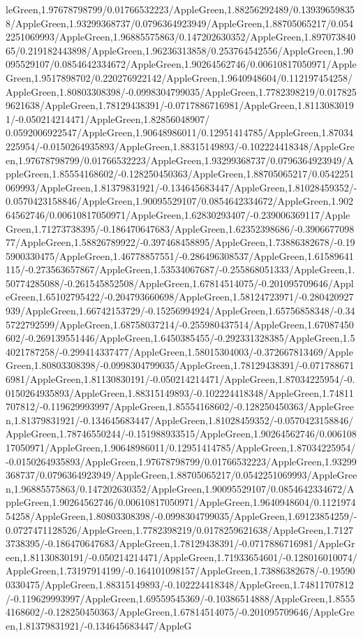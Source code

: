 {\begin{tikzternal}
{leGreen,1.97678798799/0.01766532223/AppleGreen,1.88256292489/0.139396598358/AppleGreen,1.93299368737/0.0796364923949/AppleGreen,1.88705065217/0.0542251069993/AppleGreen,1.96885575863/0.147202630352/AppleGreen,1.89707384065/0.219182443898/AppleGreen,1.96236313858/0.253764542556/AppleGreen,1.90095529107/0.0854642334672/AppleGreen,1.90264562746/0.00610817050971/AppleGreen,1.9517898702/0.220276922142/AppleGreen,1.9640948604/0.112197454258/AppleGreen,1.80803308398/-0.0998304799035/AppleGreen,1.7782398219/0.0178259621638/AppleGreen,1.78129438391/-0.0717886716981/AppleGreen,1.81130830191/-0.050214214471/AppleGreen,1.82856048907/
0.0592006922547/AppleGreen,1.90648986011/0.12951414785/AppleGreen,1.87034225954/-0.0150264935893/AppleGreen,1.88315149893/-0.102224418348/AppleGreen,1.97678798799/0.01766532223/AppleGreen,1.93299368737/0.0796364923949/AppleGreen,1.85554168602/-0.128250450363/AppleGreen,1.88705065217/0.0542251069993/AppleGreen,1.81379831921/-0.134645683447/AppleGreen,1.81028459352/-0.0570423158846/AppleGreen,1.90095529107/0.0854642334672/AppleGreen,1.90264562746/0.00610817050971/AppleGreen,1.62830293407/-0.239006369117/AppleGreen,1.71273738395/-0.186470647683/AppleGreen,1.62352398686/-0.390667709877/AppleGreen,1.58826789922/-0.397468458895/AppleGreen,1.73886382678/-0.195900330475/AppleGreen,1.46778857551/-0.286496308537/AppleGreen,1.61589641115/-0.273563657867/AppleGreen,1.53534067687/-0.255868051333/AppleGreen,1.50774285088/-0.261545852508/AppleGreen,1.67814514075/-0.201095709646/AppleGreen,1.65102795422/-0.204793660698/AppleGreen,1.58124723971/-0.280420927939/AppleGreen,1.66742153729/-0.15256994924/AppleGreen,1.65756858348/-0.345722792599/AppleGreen,1.68758037214/-0.255980437514/AppleGreen,1.67087450602/-0.269139551446/AppleGreen,1.6450385455/-0.292331328385/AppleGreen,1.54021787258/-0.299414337477/AppleGreen,1.58015304003/-0.372667813469/AppleGreen,1.80803308398/-0.0998304799035/AppleGreen,1.78129438391/-0.0717886716981/AppleGreen,1.81130830191/-0.050214214471/AppleGreen,1.87034225954/-0.0150264935893/AppleGreen,1.88315149893/-0.102224418348/AppleGreen,1.74811707812/-0.119629993997/AppleGreen,1.85554168602/-0.128250450363/AppleGreen,1.81379831921/-0.134645683447/AppleGreen,1.81028459352/-0.0570423158846/AppleGreen,1.78746550244/-0.151988933515/AppleGreen,1.90264562746/0.00610817050971/AppleGreen,1.90648986011/0.12951414785/AppleGreen,1.87034225954/-0.0150264935893/AppleGreen,1.97678798799/0.01766532223/AppleGreen,1.93299368737/0.0796364923949/AppleGreen,1.88705065217/0.0542251069993/AppleGreen,1.96885575863/0.147202630352/AppleGreen,1.90095529107/0.0854642334672/AppleGreen,1.90264562746/0.00610817050971/AppleGreen,1.9640948604/0.112197454258/AppleGreen,1.80803308398/-0.0998304799035/AppleGreen,1.69123854259/-0.0727471128526/AppleGreen,1.7782398219/0.0178259621638/AppleGreen,1.71273738395/-0.186470647683/AppleGreen,1.78129438391/-0.0717886716981/AppleGreen,1.81130830191/-0.050214214471/AppleGreen,1.71933654601/-0.128016010074/AppleGreen,1.73197914199/-0.164101098157/AppleGreen,1.73886382678/-0.195900330475/AppleGreen,1.88315149893/-0.102224418348/AppleGreen,1.74811707812/-0.119629993997/AppleGreen,1.69559545369/-0.10386514888/AppleGreen,1.85554168602/-0.128250450363/AppleGreen,1.67814514075/-0.201095709646/AppleGreen,1.81379831921/-0.134645683447/AppleG}
\end{tikzternal}}

